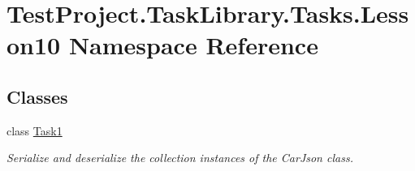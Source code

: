 \hypertarget{namespace_test_project_1_1_task_library_1_1_tasks_1_1_lesson10}{}\section{Test\+Project.\+Task\+Library.\+Tasks.\+Lesson10 Namespace Reference}
\label{namespace_test_project_1_1_task_library_1_1_tasks_1_1_lesson10}
\subsection*{Classes}
\begin{DoxyCompactItemize}
\item 
class \mbox{\hyperlink{class_test_project_1_1_task_library_1_1_tasks_1_1_lesson10_1_1_task1}{Task1}}
\begin{DoxyCompactList}\small\item\em Serialize and deserialize the collection instances of the Car\+Json class. \end{DoxyCompactList}\end{DoxyCompactItemize}
